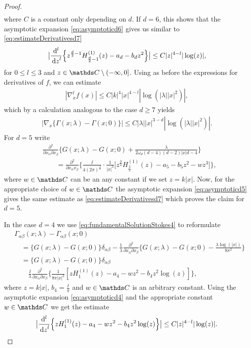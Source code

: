 \begin{proof}
\begin{align*}
\end{align*}
where $C$ is a constant only depending on $d$.
If $d = 6$, this shows that the asymptotic expansion \eqref{eq:asymptoticd6} gives us similar to \eqref{eq:estimateDerivativesd7}
\begin{align}
  \label{eq:estimateDerivativesd6}
  \big| \frac{\mathrm{d}^l}{\, {\operatorname{d}\!{z}}^l} \Big\{ z^{\frac{d}{2} - 1} H_{\frac{d}{2} - 1}^{(1)}(z) - a_d - b_d z^2 \Big\} \big| \leq C |z|^{4 - l} | \log(z) |,
\end{align}
for $0 \leq l \leq 3$ and $z \in \C \setminus (-\infty, 0]$.
Using as before the expressions for derivatives of $f$, we can estimate
\begin{align*}
  |\nabla_x^l f(x) | \leq C |k|^4 |x|^{4 - l} |\log(|\lambda| |x|^2) |, 
\end{align*}
which by a calculation analogous to the case $d \geq 7$ yields
\begin{align*}
  | \nabla_x \{ \Gamma(x; \lambda) - \Gamma(x; 0) \}| \leq C |\lambda| |x|^{3 - d} | \log(|\lambda| |x|^2) |.
\end{align*}
For $d = 5$ write
\begin{align*}
  &\frac{\partial^2}{\partial x_\alpha \partial x_\beta} \Big\{ G(x; \lambda) - G(x; 0) + \frac{\lambda}{2 \omega_d (d - 4) (d - 2) |x|{d - 4}} \Big\} \\
  &\qquad= \frac{\partial^2}{\partial x_\alpha x_\beta} \Big\{ \frac{\ii}{4(2\pi)^{\frac{3}{2}}} \cdot \frac{1}{|x|^3} \big[ z^{\frac{3}{2}} H_{\frac{3}{2}}^{(1)}(z) - a_5 - b_5 z^2 - w z^3 \big] \Big\},
\end{align*}
where $w\in\C$ can be an any constant if we set $z = k|x|$.
Now, for the appropriate choice of $w \in \C$ the asymptotic expansion \eqref{eq:asymptoticd5} gives the same estimate as \eqref{eq:estimateDerivativesd7} which proves the claim for $d = 5$.

In the case $d = 4$ we use \eqref{eq:fundamentalSolutionStokes4} to reformulate
\begin{align*}
  &\Gamma_{\alpha\beta}(x; \lambda) - \Gamma_{\alpha\beta}(x; 0) \\
  &\quad= \{ G(x; \lambda) - G(x; 0) \}\delta_{\alpha\beta}  
  - \frac{1}{\lambda} \frac{\partial^2}{\partial x_\alpha \partial x_\beta} \Big\{ G(x; \lambda) - G(x; 0) - \frac{\lambda \log(|x|)}{8 \pi^2} \Big\} \\
  &\quad= \{ G(x; \lambda) - G(x; 0) \} \delta_{\alpha\beta} \\
  &\qquad \frac{\ii}{\lambda} \frac{\partial^2}{\partial x_\alpha \partial x_\beta} \Big\{ \frac{1}{8 \pi |x|^2} [ z H_1^{(1)}(z) - a_4 - w z^2 - b_4 z^2 \log(z)] \Big\},
\end{align*}
where $z = k |x|$, $b_4 = \frac{\ii}{\pi}$ and $w \in \C$ is an arbitrary constant. Using the asymptotic expansion \eqref{eq:asymptoticd4} and the appropriate constant $w \in \C$ we get the estimate
\begin{align*}
  \big| \frac{\mathrm{d}^l}{\, {\operatorname{d}\!{z}}^l} \Big\{ z H_1^{(1)}(z) - a_4 - w z^2 - b_4 z^2 \log(z) \Big\} \big| \leq C |z|^{4 - l} |\log(z)|.
\end{align*}


\end{proof}
